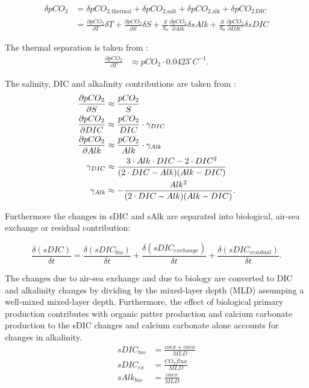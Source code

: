 \documentclass[12pt]{article}
\begin{document}
\begin{align*}
\delta pCO_2&=\delta pCO_{\text{2,thermal}}+\delta pCO_{\text{2,salt}}+\delta pCO_{\text{2,alk}}+\delta pCO_{\text{2,DIC}} \\
&= \frac{\partial pCO_2}{\partial T}\delta T + \frac{\partial pCO_2}{\partial S}\delta S  + \frac{S}{S_0}\frac{\partial pCO_2}{\partial Alk}\delta sAlk  + \frac{S}{S_0}\frac{\partial pCO_2}{\partial DIC}\delta sDIC 
\end{align*}

\noindent The thermal separation is taken from \cite{Takahashi1993}:
\begin{align*}
\frac{\partial pCO_2}{\partial T} &\approx pCO_2 \cdot 0.0423 ^\circ C^{-1}  .
\end{align*}

\noindent The salinity, DIC and alkalinity contributions are taken from \cite{Sarmiento2006}:
\begin{align*}
\allowdisplaybreaks
\frac{\partial pCO_2}{\partial S} &\approx \frac{pCO_2}{S} \\
\frac{\partial pCO_2}{\partial DIC} &\approx \frac{pCO_2}{DIC} \cdot \gamma_{DIC} \\
\frac{\partial pCO_2}{\partial Alk} &\approx \frac{pCO_2}{Alk} \cdot \gamma_{Alk} \\
\gamma_{DIC} &\approx \frac{3 \cdot Alk \cdot DIC - 2 \cdot DIC^2}{(2 \cdot DIC - Alk)(Alk-DIC)} \\
\gamma_{Alk} &\approx -\frac{Alk^2}{(2 \cdot DIC - Alk)(Alk-DIC)}.
\end{align*}

\noindent Furthermore the changes in sDIC and sAlk are separated into biological, air-sea exchange or residual contribution:

\[\frac{\delta (sDIC)}{\delta t}=\frac{\delta (sDIC_{bio})}{\delta t}+\frac{\delta (sDIC_{exchange})}{\delta t}+\frac{\delta (sDIC_{residual})}{\delta t}.\]

\noindent The changes due to air-sea exchange and due to biology are converted to DIC and alkalinity changes by dividing by the mixed-layer depth (MLD) assumping a well-mixed mixed-layer depth. Furthermore, the effect of biological primary production contributes with organic patter production and calcium carbonate production to the sDIC changes and calcium carbonate alone accounts for changes in alkalinity.
\begin{align*}
sDIC_{bio}&=\frac{coex+caex}{MLD} \\
sDIC_{ex}&=\frac{CO_2flux}{MLD} \\
sAlk_{bio}&=\frac{caex}{MLD}
\end{align*}
\end{document}
